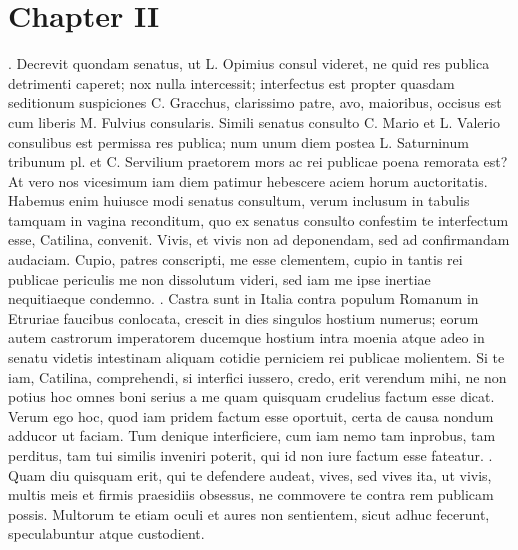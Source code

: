 \documentclass[a4paper]{article}
\begin{document}
\section{Chapter II}
\begin{pairs}
  \begin{Leftside}
    \beginnumbering
    . Decrevit quondam senatus, ut L. Opimius consul videret, ne quid res publica detrimenti caperet; nox nulla intercessit; interfectus est propter quasdam seditionum suspiciones C. Gracchus, clarissimo patre, avo, maioribus, occisus est cum liberis M. Fulvius consularis. Simili senatus consulto C. Mario et L. Valerio consulibus est permissa res publica; num unum diem postea L. Saturninum tribunum pl. et C. Servilium praetorem mors ac rei publicae poena remorata est? At vero nos vicesimum iam diem patimur hebescere aciem horum auctoritatis. Habemus enim huiusce modi senatus consultum, verum inclusum in tabulis tamquam in vagina reconditum, quo ex senatus consulto confestim te interfectum esse, Catilina, convenit. Vivis, et vivis non ad deponendam, sed ad confirmandam audaciam. Cupio, patres conscripti, me esse clementem, cupio in tantis rei publicae periculis me non dissolutum videri, sed iam me ipse inertiae nequitiaeque condemno.
    \pend
    . Castra sunt in Italia contra populum Romanum in Etruriae faucibus conlocata, crescit in dies singulos hostium numerus; eorum autem castrorum imperatorem ducemque hostium intra moenia atque adeo in senatu videtis intestinam aliquam cotidie perniciem rei publicae molientem. Si te iam, Catilina, comprehendi, si interfici iussero, credo, erit verendum mihi, ne non potius hoc omnes boni serius a me quam quisquam crudelius factum esse dicat. Verum ego hoc, quod iam pridem factum esse oportuit, certa de causa nondum adducor ut faciam. Tum denique interficiere, cum iam nemo tam inprobus, tam perditus, tam tui similis inveniri poterit, qui id non iure factum esse fateatur.
    \pend
    . Quam diu quisquam erit, qui te defendere audeat, vives, sed vives ita, ut vivis, multis meis et firmis praesidiis obsessus, ne commovere te contra rem publicam possis. Multorum te etiam oculi et aures non sentientem, sicut adhuc fecerunt, speculabuntur atque custodient.
    \pend
    \endnumbering
  \end{Leftside}
  \begin{Rightside}
    \beginnumbering
    \pstart

\end{Rightside}
\end{pairs}
\end{document}
